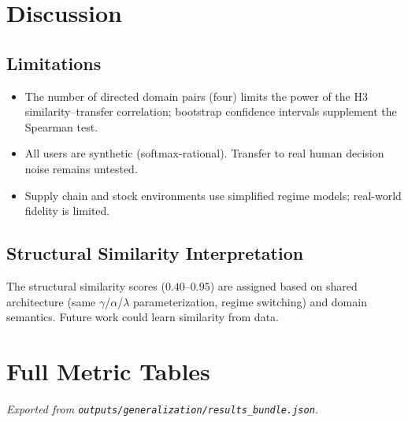 \documentclass[11pt]{article}
\begin{document}
\section{Discussion}

\subsection{Limitations}

\begin{itemize}
  \item The number of directed domain pairs (four) limits the power of the
    H3 similarity--transfer correlation; bootstrap confidence intervals
    supplement the Spearman test.
  \item All users are synthetic (softmax-rational).  Transfer to real human
    decision noise remains untested.
  \item Supply chain and stock environments use simplified regime models;
    real-world fidelity is limited.
\end{itemize}

\subsection{Structural Similarity Interpretation}

The structural similarity scores ($0.40$--$0.95$) are assigned based on
shared architecture (same $\gamma$/$\alpha$/$\lambda$ parameterization,
regime switching) and domain semantics.  Future work could learn similarity
from data.

\appendix
\section{Full Metric Tables}

\textit{Exported from \texttt{outputs/generalization/results\_bundle.json}.}

% 
% 
% 
% 
\end{document}
